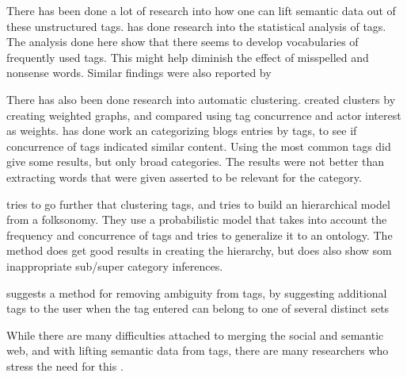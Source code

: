 There has been done a lot of research into how one can lift semantic data out of these unstructured tags.
\citet{Golder2005} has done research into the statistical analysis of tags. 
The analysis done here show that there seems to develop vocabularies of frequently used tags. 
This might help diminish the effect of misspelled and nonsense words. Similar findings were also reported by \citep{Shirky2007}

There has also been done research into automatic clustering. 
\citet{Mika2005} created clusters by creating weighted graphs, and compared using tag concurrence and actor interest as weights.  
\citet{Brooks2006} has done work an categorizing blogs entries by tags, to see if concurrence of tags indicated similar content. 
Using the most common tags did give some results, but only broad categories. The results were not better than extracting words that were given asserted to be relevant for the category.

\citep{Tang2009} tries to go further that clustering tags, and tries to build an hierarchical model from a folksonomy. 
They use a probabilistic model that takes into account the frequency and concurrence of tags and tries to generalize it to an ontology. 
The method does get good results in creating the hierarchy, but does also show som inappropriate sub/super category inferences.

\citet{Weinberger2008} suggests a method for removing ambiguity from tags,
 by suggesting additional tags to the user when the tag entered can belong to one of several distinct sets 

While there are many difficulties attached to merging the social and semantic web, 
and with lifting semantic data from tags, there are many researchers who stress the need for this \citep{Passant2007,Mika2005, Gruber2007}.

